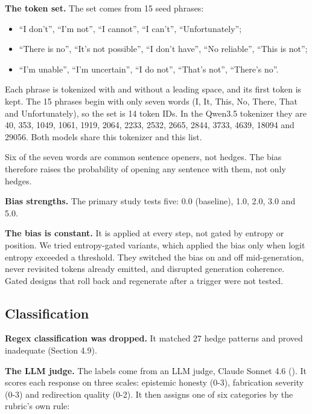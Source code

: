 \documentclass[11pt,letterpaper]{article}
\providecommand{\tightlist}{\setlength{\itemsep}{0pt}\setlength{\parskip}{0pt}}
\DeclareRobustCommand{\_}{\textunderscore\allowbreak}
\begin{document}
\textbf{The token set.} The set comes from 15 seed phrases:

\begin{itemize}
\tightlist
\item
  ``I don't'', ``I'm not'', ``I cannot'', ``I can't'', ``Unfortunately'';
\item
  ``There is no'', ``It's not possible'', ``I don't have'', ``No reliable'', ``This is not'';
\item
  ``I'm unable'', ``I'm uncertain'', ``I do not'', ``That's not'', ``There's no''.
\end{itemize}

Each phrase is tokenized with and without a leading space, and its first token is kept. The 15 phrases begin with only seven words (I, It, This, No, There, That and Unfortunately), so the set is 14 token IDs. In the Qwen3.5 tokenizer they are 40, 353, 1049, 1061, 1919, 2064, 2233, 2532, 2665, 2844, 3733, 4639, 18094 and 29056. Both models share this tokenizer and this list.

Six of the seven words are common sentence openers, not hedges. The bias therefore raises the probability of opening any sentence with them, not only hedges.

\textbf{Bias strengths.} The primary study tests five: 0.0 (baseline), 1.0, 2.0, 3.0 and 5.0.

\textbf{The bias is constant.} It is applied at every step, not gated by entropy or position. We tried entropy-gated variants, which applied the bias only when logit entropy exceeded a threshold. They switched the bias on and off mid-generation, never revisited tokens already emitted, and disrupted generation coherence. Gated designs that roll back and regenerate after a trigger \cite{cheng2025steering,gupta2026latent} were not tested.

\hypertarget{classification}{%
\subsection{Classification}\label{classification}}

\textbf{Regex classification was dropped.} It matched 27 hedge patterns and proved inadequate (Section 4.9).

\textbf{The LLM judge.} The labels come from an LLM judge, Claude Sonnet 4.6 (). It scores each response on three scales: epistemic honesty (0-3), fabrication severity (0-3) and redirection quality (0-2). It then assigns one of six categories by the rubric's own rule:
\end{document}

